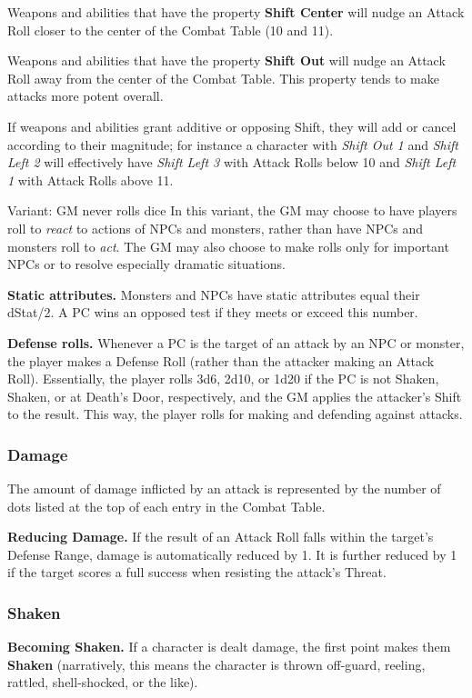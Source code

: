 \documentclass[10pt,twoside,twocolumn,openany]{book}
\begin{document}
Weapons and abilities that have the property \textbf{Shift Center} will nudge an Attack Roll closer to the center of the Combat Table (10 and 11).

Weapons and abilities that have the property \textbf{Shift Out} will nudge an Attack Roll away from the center of the Combat Table. This property tends to make attacks more potent overall.

If weapons and abilities grant additive or opposing Shift, they will add or cancel according to their magnitude; for instance a character with \textit{Shift Out 1} and \textit{Shift Left 2} will effectively have \textit{Shift Left 3} with Attack Rolls below 10 and \textit{Shift Left 1} with Attack Rolls above 11.

\begin{commentbox}{Variant: GM never rolls dice}
In this variant, the GM may choose to have players roll to \textit{react} to actions of NPCs and monsters, rather than have NPCs and monsters roll to \textit{act}. The GM may also choose to make rolls only for important NPCs or to resolve especially dramatic situations.
\par \textbf{Static attributes.} Monsters and NPCs have static attributes equal their dStat/2. A PC wins an opposed test if they meets or exceed this number.
\par \textbf{Defense rolls.} Whenever a PC is the target of an attack by an NPC or monster, the player makes a Defense Roll (rather than the attacker making an Attack Roll). Essentially, the player rolls 3d6, 2d10, or 1d20 if the PC is not Shaken, Shaken, or at Death's Door, respectively, and the GM applies the attacker's Shift to the result. This way, the player rolls for making and defending against attacks.
\end{commentbox}

\subsubsection{Damage}
The amount of damage inflicted by an attack is represented by the number of dots listed at the top of each entry in the Combat Table.

\textbf{Reducing Damage.} If the result of an Attack Roll falls within the target's Defense Range, damage is automatically reduced by 1. It is further reduced by 1 if the target scores a full success when resisting the attack's Threat.

\subsubsection{Shaken}
\textbf{Becoming Shaken.} If a character is dealt damage, the first point makes them \textbf{Shaken} (narratively, this means the character is thrown off-guard, reeling, rattled, shell-shocked, or the like).
\end{document}
